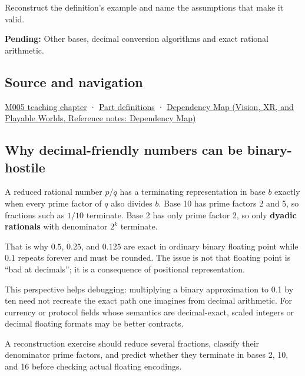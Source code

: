 Reconstruct the definition's example and name the assumptions that make it valid.

\textbf{Pending:} Other bases, decimal conversion algorithms and exact rational arithmetic.

\subsection{Source and navigation}\label{appendix-2a2f1b74bdd3-source-and-navigation}

\hyperref[01-foundations-i-ch001-when-arithmetic-meets-uncertainty]{M005 teaching chapter} · \hyperref[appendix-fd090d982a15-m005---parts-77-88]{Part definitions} · \href{../07-Vision-XR-and-Playable-Worlds/main.pdf\#nameddest=appendix-4ad47bdd269a}{Dependency Map (Vision, XR, and Playable Worlds, Reference notes: Dependency Map)}

\subsection{Why decimal-friendly numbers can be binary-hostile}\label{appendix-2a2f1b74bdd3-why-decimal-friendly-numbers-can-be-binary-hostile}

A reduced rational number \(p/q\) has a terminating representation in base \(b\) exactly when every prime factor of \(q\) also divides \(b\). Base 10 has prime factors 2 and 5, so fractions such as \(1/10\) terminate. Base 2 has only prime factor 2, so only \textbf{dyadic rationals} with denominator \(2^k\) terminate.

That is why \(0.5\), \(0.25\), and \(0.125\) are exact in ordinary binary floating point while \(0.1\) repeats forever and must be rounded. The issue is not that floating point is ``bad at decimals''; it is a consequence of positional representation.

This perspective helps debugging: multiplying a binary approximation to 0.1 by ten need not recreate the exact path one imagines from decimal arithmetic. For currency or protocol fields whose semantics are decimal-exact, scaled integers or decimal floating formats may be better contracts.

A reconstruction exercise should reduce several fractions, classify their denominator prime factors, and predict whether they terminate in bases 2, 10, and 16 before checking actual floating encodings.
